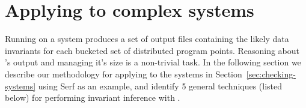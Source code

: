 \section{Applying \dinv to complex systems}
\label{sec:application}

Running \dinv on a system produces a set of output files containing
the likely data invariants for each bucketed set of distributed
program points. Reasoning about \dinv's output and managing it's size
is a non-trivial task. In the following section we describe our
methodology for applying \dinv to the systems in
Section~\ref{sec:checking-systems} using Serf as an example, and
identify 5 general techniques (listed below) for performing invariant
inference with \dinv.


